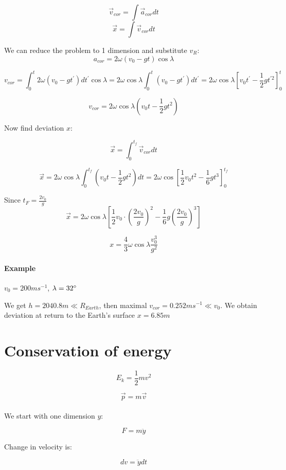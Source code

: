$$\vec{v}_{cor} = \int \vec{a}_{cor} dt$$
$$\vec{x}= \int \vec{v}_{cor} dt$$

We can reduce the problem to 1 dimension and substitute $v_R$:
$$a_{cor} = 2 \omega (v_0 - gt) \cos \lambda$$

$$v_{cor} = \int_{0}^{t} 2 \omega (v_0 -gt^{\prime})dt^{\prime} \cos \lambda = 2 \omega \cos \lambda \int_{0}^{t}  \left(v_0 -gt^{\prime}\right) dt^{\prime} = 2 \omega \cos \lambda \left[  v_0 t^\prime - \frac{1}{2} gt^{\prime2}  \right]^t_0$$

$$v_{cor} = 2 \omega \cos \lambda \left(v_0t - \frac{1}{2}gt^2\right)$$

Now find deviation $x$:

$$\vec{x} = \int_0^{t_f} \vec{v}_{cor} dt$$

$$\vec{x} = 2 \omega \cos \lambda  \int_0^{t_f} \left(v_0t - \frac{1}{2}gt^2\right) dt =  2 \omega \cos \left[  \frac{1}{2}v_0 t^2 - \frac{1}{6}gt^{3}  \right]^{t_f}_0 $$

Since $t_F = \frac{2v_0}{g}$
$$\vec{x} = 2 \omega \cos \lambda  \left[ \frac{1}{2} v_0 \cdot \left( \frac{2v_0}{g} \right)^2 - \frac{1}{6}g \left(\frac{2v_0}{g}\right)^3 \right] $$

$$x = \frac{4}{3} \omega \cos \lambda \frac{v_0^3}{g^2}$$

\paragraph{Example} $v_0 = 200 ms^{-1}$, $\lambda=32\degree$

We get $h = 2040.8m \ll R_{Earth}$, then maximal $v_{cor} = 0.252 ms^{-1} \ll v_0$. We obtain deviation at return to the Earth's surface $x  = 6.85 m$

\section{Conservation of energy}

$$E_k = \frac{1}{2}mv^2$$ 

$$\vec{p}=m\vec{v}$$

\paragraph{} We start with one dimension $y$:

$$F = m \ddot{y}$$

Change in velocity is:

$$dv = \ddot{y}dt$$

